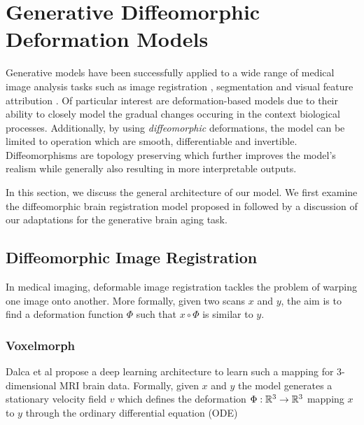 \chapter{Generative Diffeomorphic Deformation Models}
Generative models have been successfully applied to a wide range of medical image analysis tasks such as image registration \cite{balakrishnan2019voxelmorph}, segmentation \cite{dong2017automatic} and visual feature attribution \cite{baumgartner2018visual}. Of particular interest are deformation-based models due to their ability to closely model the gradual changes occuring in the context biological processes.
Additionally, by using \textit{diffeomorphic} deformations, the model can be limited to operation which are smooth, differentiable and invertible.
Diffeomorphisms are topology preserving which further improves the model's realism while generally also resulting in more interpretable outputs.



In this section, we discuss the general architecture of our model. We first examine the diffeomorphic brain registration model proposed in \cite{balakrishnan2019voxelmorph} \cite{dalca2018unsupervised} followed by a discussion of our adaptations for the generative brain aging task.

\section{Diffeomorphic Image Registration}
\label{chap:voxelmorph}
In medical imaging, deformable image registration tackles the problem of warping one image onto another. More formally, given two scans $x$ and $y$, the aim is to find a deformation function $\Phi$ such that $x \circ \Phi$ is similar to $y$.

\subsection{Voxelmorph} \label{sec:vox}
Dalca et al \cite{dalca2018unsupervised} propose a deep learning architecture to learn such a mapping for 3-dimensional MRI brain data. Formally, given $x$ and $y$ the model generates a stationary velocity field $v$ which defines the deformation ${\Phi : \mathbb{R}^3 \rightarrow \mathbb{R}^3}$ mapping $x$ to $y$ through the ordinary differential equation (ODE)


